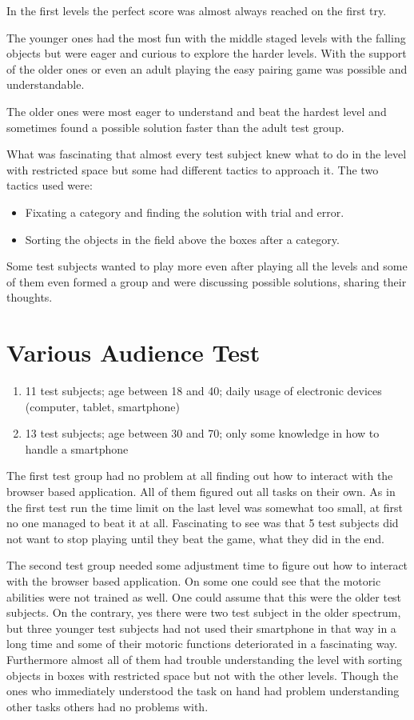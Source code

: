 In the first levels the perfect score was almost always reached on the first try.

The younger ones had the most fun with the middle staged levels with the falling objects but were eager and curious
to explore the harder levels. With the support of the older ones or even an adult playing the easy pairing game
was possible and understandable.

The older ones were most eager to understand and beat the hardest level and sometimes found a possible solution
faster than the adult test group.

What was fascinating that almost every test subject knew what to do in the level with restricted space but
some had different tactics to approach it. The two tactics used were:
\begin{itemize}
    \item Fixating a category and finding the solution with trial and error.
    \item Sorting the objects in the field above the boxes after a category.
\end{itemize}

Some test subjects wanted to play more even after playing all the levels and some of them even formed a group and
were discussing possible solutions, sharing their thoughts.

\section{Various Audience Test}\label{sec:various-audience-test}
\begin{enumerate}
    \item 11 test subjects; age between 18 and 40; daily usage of electronic devices (computer, tablet, smartphone)
    \item 13 test subjects; age between 30 and 70; only some knowledge in how to handle a smartphone
\end{enumerate}

The first test group had no problem at all finding out how to interact with the browser based application.
All of them figured out all tasks on their own. As in the first test run the time limit on the last level was somewhat
too small, at first no one managed to beat it at all. Fascinating to see was that 5 test subjects did not want to stop
playing until they beat the game, what they did in the end.

The second test group needed some adjustment time to figure out how to interact with the browser based application.
On some one could see that the motoric abilities were not trained as well. One could assume that this were the older
test subjects. On the contrary, yes there were two test subject in the older spectrum, but three younger test subjects
had not used their smartphone in that way in a long time and some of their motoric functions deteriorated
in a fascinating way.
Furthermore almost all of them had trouble understanding the level with sorting objects in boxes with restricted space
but not with the other levels.
Though the ones who immediately understood the task on hand had problem understanding other tasks others had no problems with.

